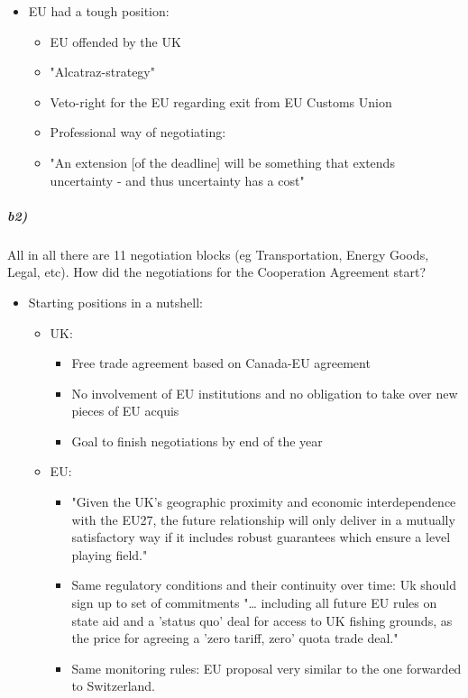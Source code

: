 \begin{itemize}
    \item EU had a tough position:
        \begin{itemize}
            \item EU offended by the UK
            \item "Alcatraz-strategy"
            \item Veto-right for the EU regarding exit from EU Customs Union
            \item Professional way of negotiating:
            \item "An extension [of the deadline] will be something that
                extends uncertainty - and thus uncertainty has a cost"
        \end{itemize}
\end{itemize}

\subparagraph{b2)}

All in all there are 11 negotiation blocks (eg Transportation, Energy Goods,
Legal, etc). How did the negotiations for the Cooperation Agreement start?

\begin{itemize}
    \item Starting positions in a nutshell:
        \begin{itemize}
            \item UK:
                \begin{itemize}
                    \item Free trade agreement based on Canada-EU agreement
                    \item No involvement of EU institutions and no obligation
                        to take over new pieces of EU acquis
                    \item Goal to finish negotiations by end of the year
                \end{itemize}
            \item EU:
                \begin{itemize}
                    \item "Given the UK's geographic proximity and economic
                        interdependence with the EU27, the future relationship
                        will only deliver in a mutually satisfactory way if it
                        includes robust guarantees which ensure a level playing
                        field."
                    \item Same regulatory conditions and their continuity over
                        time: Uk should sign up to set of commitments "\dots
                        including all future EU rules on state aid and a 'status
                        quo' deal for access to UK fishing grounds, as the price
                        for agreeing a 'zero tariff, zero' quota trade deal."
                    \item Same monitoring rules: EU proposal very similar to the
                        one forwarded to Switzerland.
                \end{itemize}
        \end{itemize}
\end{itemize}

